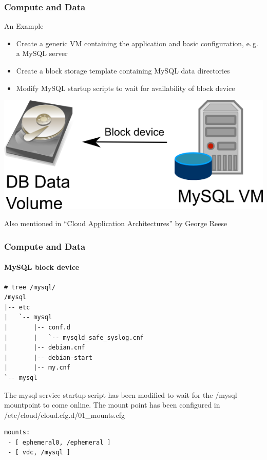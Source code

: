 \begin{frame}
\frametitle{Compute and Data}
An Example
\begin{itemize}
\item Create a generic VM containing the application and basic
  configuration, e.\,g. a MySQL server
\item Create a block storage template containing MySQL data directories
\item Modify MySQL startup scripts to wait for availability of block device
\end{itemize}

\includegraphics[width=.4\textwidth]{images/DBaaS.png}

\hfill\tiny Also mentioned in ``Cloud Application Architectures'' by George Reese
\end{frame}

\begin{frame}[fragile]
\frametitle{Compute and Data}
\framesubtitle{MySQL block device}
\begin{lstlisting}
# tree /mysql/
/mysql
|-- etc
|   `-- mysql
|       |-- conf.d
|       |   `-- mysqld_safe_syslog.cnf
|       |-- debian.cnf
|       |-- debian-start
|       |-- my.cnf
`-- mysql
\end{lstlisting}
The mysql service startup script has been modified to wait for the /mysql mountpoint
to come online. The mount point has been configured in /etc/cloud/cloud.cfg.d/01\_mounts.cfg
\begin{lstlisting}
mounts:
 - [ ephemeral0, /ephemeral ]
 - [ vdc, /mysql ]
\end{lstlisting}
\end{frame}

